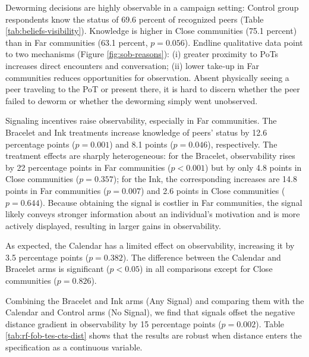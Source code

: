 \documentclass[12pt,a4paper]{article}
\begin{document}

Deworming decisions are highly observable in a campaign setting: Control group respondents know the status of 69.6 percent of recognized peers (Table \ref{tab:beliefs-visibility}).  Knowledge is higher in Close communities (75.1 percent) than in Far communities (63.1 percent, $p = 0.056$). Endline qualitative data point to two mechanisms (Figure \ref{fig:sob-reasons}): (i) greater proximity to PoTs increases direct encounters and conversation; (ii) lower take‑up in Far communities reduces opportunities for observation. Absent physically seeing a peer traveling to the PoT or present there, it is hard to discern whether the peer failed to deworm or whether the deworming simply went unobserved.

Signaling incentives raise observability, especially in Far communities.  The Bracelet and Ink treatments increase knowledge of peers’ status by 12.6 percentage points ($p = 0.001$) and 8.1 points ($p = 0.046$), respectively.  The treatment effects are sharply heterogeneous: for the Bracelet, observability rises by 22 percentage points in Far communities ($p<0.001$) but by only 4.8 points in Close communities ($p=0.357$); for the Ink, the corresponding increases are 14.8 points in Far communities ($p=0.007$) and 2.6 points in Close communities ($p=0.644$). Because obtaining the signal is costlier in Far communities, the signal likely conveys stronger information about an individual’s motivation and is more actively displayed, resulting in larger gains in observability. 

As expected, the Calendar has a limited effect on observability, increasing it by 3.5 percentage points ($p = 0.382$). The difference between the Calendar and Bracelet arms is significant ($p < 0.05$) in all comparisons except for Close communities ($p = 0.826$).

Combining the Bracelet and Ink arms (Any Signal) and comparing them with the Calendar and Control arms (No Signal), we find that signals offset the negative distance gradient in observability by 15 percentage points ($p = 0.002$). Table \ref{tab:rf-fob-tes-cts-dist} shows that the results are robust when distance enters the specification as a continuous variable. 
\end{document}
